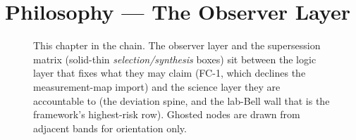 \chapter{Philosophy --- The Observer Layer}\label{ch:philosophy}


\begin{figure}[t]
  \centering
  \caption[This chapter in the chain (Philosophy band)]{This chapter in the
    chain. The observer layer and the supersession matrix (solid-thin
    \emph{selection/synthesis} boxes) sit between the logic layer that fixes
    what they may claim (FC-1, which declines the measurement-map import) and
    the science layer they are accountable to (the deviation spine, and the
    lab-Bell wall that is the framework's highest-risk row). Ghosted nodes are
    drawn from adjacent bands for orientation only.}
  \label{fig:minimap-philosophy}
\end{figure}

